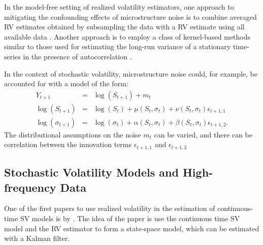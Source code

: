 In the model-free setting of realized volatility estimators, one approach to mitigating the confounding effects of microstructure noise is to combine averaged RV estimates obtained by subsampling the data with a RV estimate using all available data \citep{zhang2005tale}. Another approach is to employ a class of kernel-based methods similar to those used for estimating the long-run variance of a stationary time-series in the presence of autocorrelation \citep{hansen2006realized}. 

In the context of stochastic volatility, microstructure noise could, for example, be accounted for with a model of the form:
\begin{eqnarray*}
	Y_{t+1} &=& \log(S_{t+1}) + m_{t} \\
	\log(S_{t+1}) &=& \log(S_{t}) + \mu(S_t, \sigma_t) + \nu(S_t, \sigma_t)\epsilon_{t+1,1} \\
	\log(\sigma_{t+1}) &=& \log(\sigma_{t}) + \alpha(S_t, \sigma_t) + \beta(S_t, \sigma_t)\epsilon_{t+1,2}.
\end{eqnarray*} 
The distributional assumptions on the noise $m_t$ can be varied, and there can be correlation between the innovation terms $\epsilon_{t+1,1}$ and $\epsilon_{t+1,2}$
%

	\subsection{Stochastic Volatility Models and High-frequency Data} \label{sec:stoch-vol-models-and-high-freq-data}
One of the first papers to use realized volatility in the estimation of continuous-time SV models is by \cite{barndorff2002econometric}. The idea of the paper is use the continuous time SV model and the RV estimator to form a state-space model, which can be estimated with a Kalman filter.

